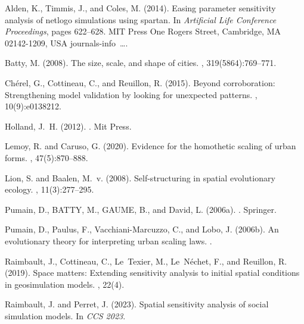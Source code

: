 \documentclass[letterpaper]{article}
\begin{document}
\begin{thebibliography}{}

Alden, K., Timmis, J., and Coles, M. (2014).
\newblock Easing parameter sensitivity analysis of netlogo simulations using
  spartan.
\newblock In {\em Artificial Life Conference Proceedings}, pages 622--628. MIT
  Press One Rogers Street, Cambridge, MA 02142-1209, USA journals-info~….

Batty, M. (2008).
\newblock The size, scale, and shape of cities.
, 319(5864):769--771.

Ch{\'e}rel, G., Cottineau, C., and Reuillon, R. (2015).
\newblock Beyond corroboration: Strengthening model validation by looking for
  unexpected patterns.
, 10(9):e0138212.

Holland, J.~H. (2012).
.
\newblock Mit Press.

Lemoy, R. and Caruso, G. (2020).
\newblock Evidence for the homothetic scaling of urban forms.
,
  47(5):870--888.

Lion, S. and Baalen, M.~v. (2008).
\newblock Self-structuring in spatial evolutionary ecology.
, 11(3):277--295.

Pumain, D., BATTY, M., GAUME, B., and David, L. (2006a).
.
\newblock Springer.

Pumain, D., Paulus, F., Vacchiani-Marcuzzo, C., and Lobo, J. (2006b).
\newblock An evolutionary theory for interpreting urban scaling laws.
.

Raimbault, J., Cottineau, C., Le~Texier, M., Le~N{\'e}chet, F., and Reuillon,
  R. (2019).
\newblock Space matters: Extending sensitivity analysis to initial spatial
  conditions in geosimulation models.
, 22(4).

Raimbault, J. and Perret, J. (2023).
\newblock Spatial sensitivity analysis of social simulation models.
\newblock In {\em CCS 2023}.


\end{thebibliography}
\end{document}
